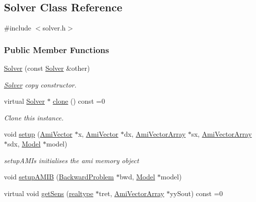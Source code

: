 \hypertarget{classamici_1_1_solver}{}\subsection{Solver Class Reference}
\label{classamici_1_1_solver}


{\ttfamily \#include $<$solver.\+h$>$}

\subsubsection*{Public Member Functions}
\begin{DoxyCompactItemize}
\item 
\mbox{\hyperlink{classamici_1_1_solver_a4676b699f5efede8bee51636bbe8b54a}{Solver}} (const \mbox{\hyperlink{classamici_1_1_solver}{Solver}} \&other)
\begin{DoxyCompactList}\small\item\em \mbox{\hyperlink{classamici_1_1_solver}{Solver}} copy constructor. \end{DoxyCompactList}\item 
virtual \mbox{\hyperlink{classamici_1_1_solver}{Solver}} $\ast$ \mbox{\hyperlink{classamici_1_1_solver_ad40c0e06f5ee35afc1dd60e9f80ac5be}{clone}} () const =0
\begin{DoxyCompactList}\small\item\em Clone this instance. \end{DoxyCompactList}\item 
void \mbox{\hyperlink{classamici_1_1_solver_a5cffde567803181ec12c71117c74b47a}{setup}} (\mbox{\hyperlink{classamici_1_1_ami_vector}{Ami\+Vector}} $\ast$x, \mbox{\hyperlink{classamici_1_1_ami_vector}{Ami\+Vector}} $\ast$dx, \mbox{\hyperlink{classamici_1_1_ami_vector_array}{Ami\+Vector\+Array}} $\ast$sx, \mbox{\hyperlink{classamici_1_1_ami_vector_array}{Ami\+Vector\+Array}} $\ast$sdx, \mbox{\hyperlink{classamici_1_1_model}{Model}} $\ast$model)
\begin{DoxyCompactList}\small\item\em setup\+A\+M\+Is initialises the ami memory object \end{DoxyCompactList}\item 
void \mbox{\hyperlink{classamici_1_1_solver_a04ef010145a9a17746128e55d4e0a436}{setup\+A\+M\+IB}} (\mbox{\hyperlink{classamici_1_1_backward_problem}{Backward\+Problem}} $\ast$bwd, \mbox{\hyperlink{classamici_1_1_model}{Model}} $\ast$model)
\item 
virtual void \mbox{\hyperlink{classamici_1_1_solver_a0db027ca9e9778c0b40afdb80f11a3af}{get\+Sens}} (\mbox{\hyperlink{namespaceamici_a1bdce28051d6a53868f7ccbf5f2c14a3}{realtype}} $\ast$tret, \mbox{\hyperlink{classamici_1_1_ami_vector_array}{Ami\+Vector\+Array}} $\ast$yy\+Sout) const =0

\end{DoxyCompactItemize}
